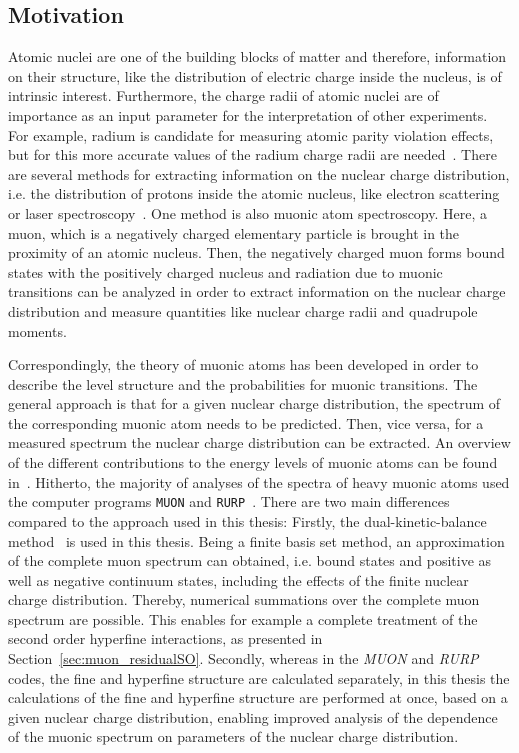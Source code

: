 \subsection{Motivation}
\label{sec:muon_motivation}
Atomic nuclei are one of the building blocks of matter and therefore, information on their structure, like the distribution of electric charge inside the nucleus, is of intrinsic interest. Furthermore, the charge radii of atomic nuclei are of importance as an input parameter for the interpretation of other experiments. For example, radium is candidate for measuring atomic parity violation effects, but for this more accurate values of the radium charge radii are needed~\cite{wansbeek2012}.
There are several methods for extracting information on the nuclear charge distribution, i.e. the distribution of protons inside the atomic nucleus, like electron scattering~\cite{devries1987} or laser spectroscopy~\cite{wang2004,dewitte2007,mueller2007}. One method is also muonic atom spectroscopy. Here, a muon, which is a negatively charged elementary particle is brought in the proximity of an atomic nucleus. Then, the negatively charged muon forms bound states with the positively charged nucleus and radiation due to muonic transitions can be analyzed in order to extract information on the nuclear charge distribution and measure quantities like nuclear charge radii and quadrupole moments.

Correspondingly, the theory of muonic atoms has been developed in order to describe the level structure and the probabilities for muonic transitions. The general approach is that for a given nuclear charge distribution, the spectrum of the corresponding muonic atom needs to be predicted. Then, vice versa, for a measured spectrum the nuclear charge distribution can be extracted. An overview of the different contributions to the energy levels of muonic atoms can be found in~\cite{BorieRinker1982}. Hitherto, the majority of analyses of the spectra of heavy muonic atoms used the computer programs \texttt{MUON} and \texttt{RURP}~\cite{rinker1979}. There are two main differences compared to the approach used in this thesis:
Firstly, the dual-kinetic-balance method~\cite{Shabaev2004} is used in this thesis. Being a finite basis set method, an approximation of the complete muon spectrum can obtained, i.e. bound states and positive as well as negative continuum states, including the effects of the finite nuclear charge distribution. Thereby, numerical summations over the complete muon spectrum are possible. This enables for example a complete treatment of the second order hyperfine interactions, as presented in Section~\ref{sec:muon_residualSO}.
Secondly, whereas in the \textit{MUON} and \textit{RURP} codes, the fine and hyperfine structure are calculated separately, in this thesis the calculations of the fine and hyperfine structure are performed at once, based on a given nuclear charge distribution, enabling improved analysis of the dependence of the muonic spectrum on parameters of the nuclear charge distribution.

